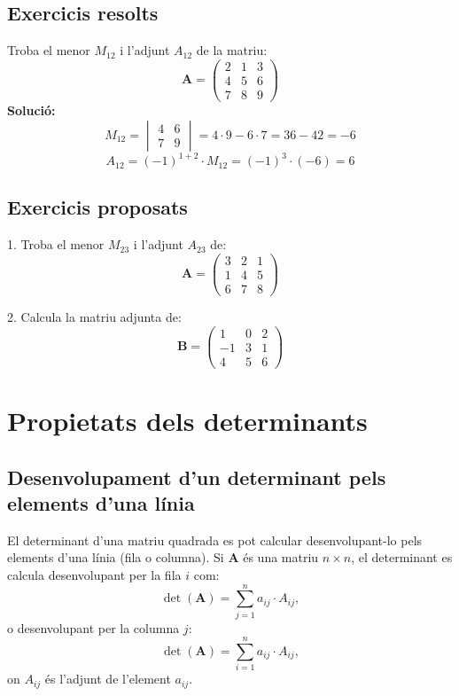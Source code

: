 \documentclass[12pt]{article}
\newcommand{\mat}[1]{\mathbf{#1}}
\begin{document}
\subsection*{Exercicis resolts}
\begin{exercici}
Troba el menor $M_{12}$ i l'adjunt $A_{12}$ de la matriu:
\[
\mat{A} = \begin{pmatrix}
2 & 1 & 3 \\
4 & 5 & 6 \\
7 & 8 & 9
\end{pmatrix}
\]
\textbf{Solució:}
\[
M_{12} = \begin{vmatrix}
4 & 6 \\
7 & 9
\end{vmatrix} = 4\cdot9 - 6\cdot7 = 36 - 42 = -6
\]
\[
A_{12} = (-1)^{1+2} \cdot M_{12} = (-1)^3 \cdot (-6) = 6
\]
\end{exercici}

\subsection*{Exercicis proposats}
\begin{exercici}
1. Troba el menor $M_{23}$ i l'adjunt $A_{23}$ de:
\[
\mat{A} = \begin{pmatrix}
3 & 2 & 1 \\
1 & 4 & 5 \\
6 & 7 & 8
\end{pmatrix}
\]

2. Calcula la matriu adjunta de:
\[
\mat{B} = \begin{pmatrix}
1 & 0 & 2 \\
-1 & 3 & 1 \\
4 & 5 & 6
\end{pmatrix}
\]
\end{exercici}

\section{Propietats dels determinants}

\subsection{Desenvolupament d'un determinant pels elements d'una línia}
\begin{concept}
El determinant d'una matriu quadrada es pot calcular desenvolupant-lo pels elements d'una línia (fila o columna). Si $\mat{A}$ és una matriu $n \times n$, el determinant es calcula desenvolupant per la fila $i$ com:
\[
\det(\mat{A}) = \sum_{j=1}^n a_{ij} \cdot A_{ij},
\]
o desenvolupant per la columna $j$:
\[
\det(\mat{A}) = \sum_{i=1}^n a_{ij} \cdot A_{ij},
\]
on $A_{ij}$ és l'adjunt de l'element $a_{ij}$.
\end{concept}
\end{document}
